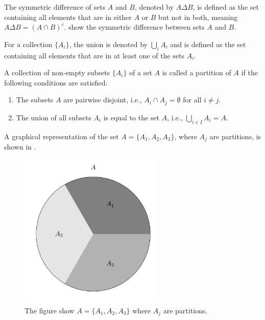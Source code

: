 \begin{definition}
	The symmetric difference of sets $A$ and $B$, denoted by $A \Delta B$, is defined as the set containing all elements that are in either $A$ or $B$ but not in both, meaning $A \Delta B = (A \cap B)^c$.  show the symmetric difference between sets $A$ and $B$.
\end{definition}

\begin{definition}
	For a collection $\{A_i\}$, the union is denoted by $\bigcup_{i} A_i$ and is defined as the set containing all elements that are in at least one of the sets $A_i$.
\end{definition}

\begin{definition}[Partition]
	A collection of non-empty subsets $\{A_i\}$ of a set $A$ is called a partition of $A$ if the following conditions are satisfied:
	\begin{enumerate}
		\item The subsets $A$ are pairwise disjoint, i.e., $A_i \cap A_j = \emptyset$ for all \(i \neq j\).
		\item The union of all subsets \(A_i\) is equal to the set \(A\), i.e., \(\bigcup_{i \in I} A_i = A\).
	\end{enumerate}
	
	A graphical representation of the set $A=\{A_1,A_2,A_3\}$, where $A_j$ are partitions, is shown in .
	\begin{figure}[h]
		\centering
		\includegraphics[width = 0.6\textwidth]{figures/set_partition.pdf}
		\caption{The figure show $A=\{A_1,A_2,A_3\}$ where $A_j$ are partitions.}
		\label{fig:set_partition}
	\end{figure}
\end{definition}


